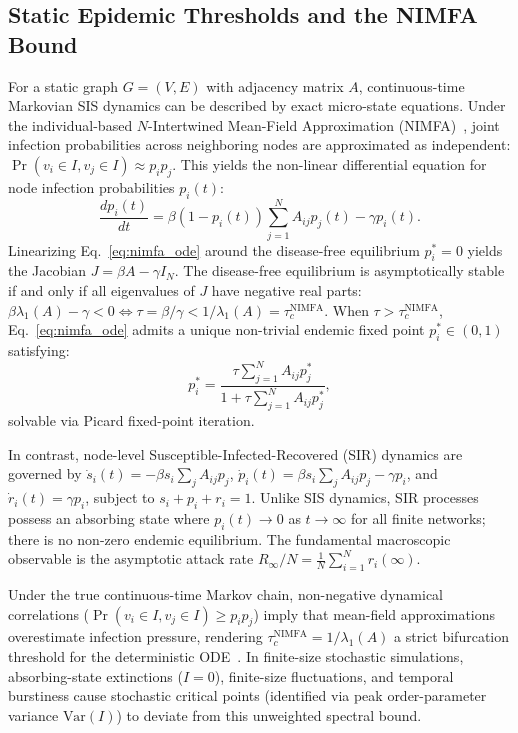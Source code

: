 \documentclass[conference]{IEEEtran}
\begin{document}
\subsection{Static Epidemic Thresholds and the NIMFA Bound}
For a static graph $G = (V, E)$ with adjacency matrix $A$, continuous-time Markovian SIS dynamics can be described by exact micro-state equations. Under the individual-based $N$-Intertwined Mean-Field Approximation (NIMFA)~\cite{vanmieghem2009virus}, joint infection probabilities across neighboring nodes are approximated as independent: $\Pr(v_i \in I, v_j \in I) \approx p_i p_j$. This yields the non-linear differential equation for node infection probabilities $p_i(t)$:
\begin{equation}
\frac{dp_i(t)}{dt} = \beta (1 - p_i(t)) \sum_{j=1}^N A_{ij} p_j(t) - \gamma p_i(t).
\label{eq:nimfa_ode}
\end{equation}
Linearizing Eq.~\eqref{eq:nimfa_ode} around the disease-free equilibrium $p_i^* = 0$ yields the Jacobian $J = \beta A - \gamma I_N$. The disease-free equilibrium is asymptotically stable if and only if all eigenvalues of $J$ have negative real parts: $\beta \lambda_1(A) - \gamma < 0 \iff \tau = \beta/\gamma < 1/\lambda_1(A) = \tau_c^{\text{NIMFA}}$. When $\tau > \tau_c^{\text{NIMFA}}$, Eq.~\eqref{eq:nimfa_ode} admits a unique non-trivial endemic fixed point $p_i^* \in (0, 1)$ satisfying:
\begin{equation}
p_i^* = \frac{\tau \sum_{j=1}^N A_{ij} p_j^*}{1 + \tau \sum_{j=1}^N A_{ij} p_j^*},
\label{eq:endemic_fixed_point}
\end{equation}
solvable via Picard fixed-point iteration.

In contrast, node-level Susceptible-Infected-Recovered (SIR) dynamics are governed by $\dot{s}_i(t) = -\beta s_i \sum_j A_{ij} p_j$, $\dot{p}_i(t) = \beta s_i \sum_j A_{ij} p_j - \gamma p_i$, and $\dot{r}_i(t) = \gamma p_i$, subject to $s_i + p_i + r_i = 1$. Unlike SIS dynamics, SIR processes possess an absorbing state where $p_i(t) \to 0$ as $t \to \infty$ for all finite networks; there is no non-zero endemic equilibrium. The fundamental macroscopic observable is the asymptotic attack rate $R_\infty / N = \frac{1}{N}\sum_{i=1}^N r_i(\infty)$.

Under the true continuous-time Markov chain, non-negative dynamical correlations ($\Pr(v_i \in I, v_j \in I) \ge p_i p_j$) imply that mean-field approximations overestimate infection pressure, rendering $\tau_c^{\text{NIMFA}} = 1/\lambda_1(A)$ a strict bifurcation threshold for the deterministic ODE~\cite{vanmieghem2009virus, chakrabarti2008epidemic}. In finite-size stochastic simulations, absorbing-state extinctions ($I=0$), finite-size fluctuations, and temporal burstiness cause stochastic critical points (identified via peak order-parameter variance $\text{Var}(I)$) to deviate from this unweighted spectral bound.
\end{document}
